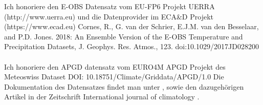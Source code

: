 
Ich honoriere den E-OBS Datensatz vom EU-FP6 Projekt UERRA (http://www.uerra.eu) und die Datenprovider im ECA\&D Projekt (https://www.ecad.eu) Cornes, R., G. van der Schrier, E.J.M. van den Besselaar, and P.D. Jones. 2018: An Ensemble Version of the E-OBS Temperature and Precipitation Datasets, J. Geophys. Res. Atmos., 123. doi:10.1029/2017JD028200
\cite[für weitere Informationen siehe][]{eobs}\\
\hfill\\
Ich honoriere den APGD datensatz vom EURO4M APGD Projekt des Meteoswiss
Dataset DOI: 10.18751/Climate/Griddata/APGD/1.0 Die Dokumentation des Datensatzes findet man unter \cite{apgd}, sowie den dazugehörigen Artikel in der Zeitschrift International journal of climatology \cite[siehe][]{apgd_article}. \cite[für weitere Informationen siehe:][]{meteoswiss}

